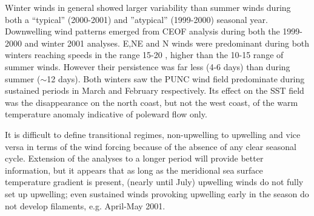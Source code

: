 Winter winds in general showed larger variability than summer
winds during both a ``typical'' (2000-2001) and ''atypical''
(1999-2000) seasonal year. Downwelling wind patterns emerged from
CEOF analysis during both the 1999-2000 and winter 2001 analyses.
E,NE and N winds were predominant during both winters reaching
speeds in the range 15-20 \vel, higher than the 10-15 \vel range
of summer winds. However their persistence was far less (4-6 days)
than during summer ($\sim$12 days). Both winters saw the PUNC wind
field predominate during sustained periods in March and February
respectively. Its effect on the SST field was the disappearance on
the north coast, but not the west coast, of the warm temperature
anomaly indicative of poleward flow only.

It is difficult to define transitional regimes, non-upwelling to
upwelling and vice versa in terms of the wind forcing because of
the absence of any clear seasonal cycle.  Extension of the
analyses to a longer period will provide better information, but
it appears that as long as the meridional sea surface temperature
gradient is present, (nearly until July) upwelling winds do not
fully set up upwelling; even sustained winds provoking upwelling
early in the season do not develop filaments, e.g. April-May 2001.

